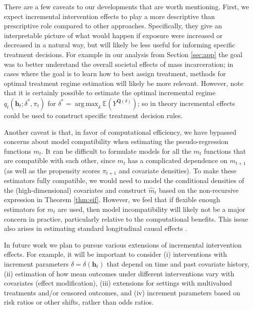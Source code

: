 \documentclass[12pt]{article}
\newcommand{\E}{\mathbb{E}}
\newcommand{\bh}{\mathbf{h}}
\newcommand{\bQ}{\mathbf{Q}}
\DeclareMathOperator*{\argmax}{arg\,max}
\theoremstyle{remark}
\begin{document}
There are a few caveats to our developments that are worth mentioning. First, we expect incremental intervention effects to play a more descriptive than prescriptive role compared to other approaches. Specifically, they give an interpretable picture of what would happen if exposure were increased or decreased in a natural way, but will likely be less useful for informing specific treatment decisions. For example in our analysis from Section \ref{sec:app} the goal was to better understand the overall societal effects of mass incarceration; in cases where the goal is to learn how to best assign treatment, methods for optimal treatment regime estimation will likely be more relevant. However, note that it is certainly possible to estimate the optimal incremental regime $q_t(\bh_t; \delta^*,\pi_t)$ for $\delta^* = \argmax_\delta \E(Y^{\bQ(\delta)})$; so in theory incremental effects could be used to construct specific treatment decision rules. 

Another caveat is that, in favor of computational efficiency, we have bypassed concerns about model compatibility when estimating the pseudo-regression functions $m_t$. It can be difficult to formulate models for all the $m_t$ functions that are compatible with each other, since $m_t$ has a complicated dependence on $m_{t+1}$ (as well as the propensity scores $\pi_{t+1}$ and covariate densities). To make these estimators fully compatible, we would need to model the conditional densities of the (high-dimensional) covariates and construct $\hat{m}_t$ based on the non-recursive expression in Theorem \ref{thm:eif}. However, we feel that if flexible enough estimators for $m_t$ are used, then model incompatibility will likely not be a major concern in practice, particularly relative to the computational benefits. This issue also arises in estimating standard longitudinal causal effects \autocite{scharfstein1999adjusting, murphy2001marginal}.

In future work we plan to pursue various extensions of incremental intervention effects. For example, it will be important to consider (i) interventions with increment parameters $\delta=\delta(\bh_t)$ that depend on time and past covariate history, (ii) estimation of how mean outcomes under different interventions vary with covariates (effect modification), (iii) extensions for settings with multivalued treatments and/or censored outcomes, and (iv) increment parameters based on risk ratios or other shifts,  rather than odds ratios.


\pagebreak
\end{document}
